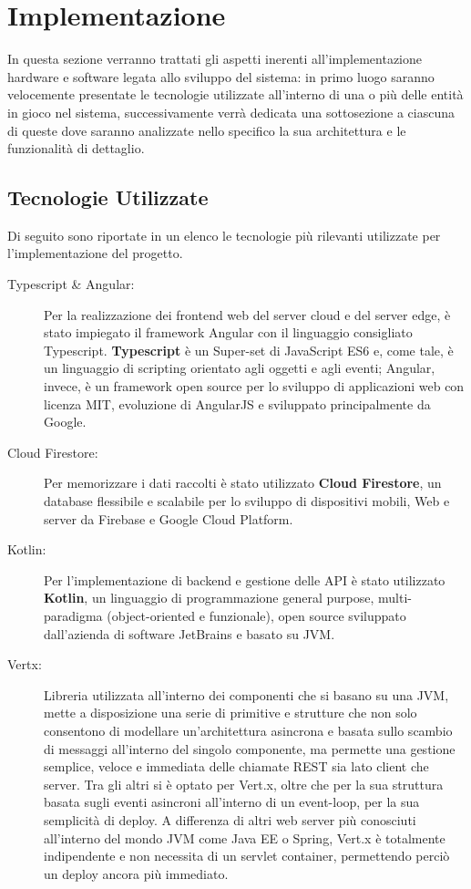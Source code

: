 \section{Implementazione}\label{sec:implementazione}

In questa sezione verranno trattati gli aspetti inerenti all’implementazione hardware
e software legata allo sviluppo del sistema: in primo luogo saranno velocemente
presentate le tecnologie utilizzate all’interno di una o più delle entità in
gioco nel sistema, successivamente verrà dedicata una sottosezione a ciascuna di
queste dove saranno analizzate nello specifico la sua architettura e le funzionalità
di dettaglio.

\subsection{Tecnologie Utilizzate}

Di seguito sono riportate in un elenco le tecnologie più rilevanti utilizzate per l'implementazione del progetto.

\begin{description}
  \item[Typescript \& Angular: ]
    Per la realizzazione dei frontend web del server cloud e del server edge, è stato impiegato il framework Angular con il linguaggio consigliato Typescript.
    \textbf{Typescript} è un Super-set di JavaScript ES6 e, come tale, è un linguaggio di scripting orientato agli oggetti e agli eventi; Angular, invece, è un framework open source per lo sviluppo di applicazioni web con licenza MIT, evoluzione di AngularJS e sviluppato principalmente da Google.
  \item[Cloud Firestore: ]
    Per memorizzare i dati raccolti è stato utilizzato \textbf{Cloud Firestore}, un database flessibile e scalabile per lo sviluppo di dispositivi mobili, Web e server da Firebase e Google Cloud Platform.
  \item[Kotlin: ]
    Per l'implementazione di backend e gestione delle API è stato utilizzato \textbf{Kotlin}, un linguaggio di programmazione general purpose, multi-paradigma (object-oriented e funzionale), open source sviluppato dall'azienda di software JetBrains e basato su JVM.
  \item[Vertx: ]
  Libreria utilizzata all’interno dei componenti che si basano su una JVM, mette a disposizione una serie di primitive e strutture che non solo consentono di modellare un’architettura asincrona e basata sullo scambio di messaggi all’interno del singolo componente, ma permette una gestione semplice, veloce e immediata delle chiamate REST sia lato client che server.
  Tra gli altri si è optato per Vert.x, oltre che per la sua struttura basata sugli eventi asincroni all’interno di un event-loop, per la sua semplicità di deploy. A differenza di altri web server più conosciuti all’interno del mondo JVM come Java EE o Spring, Vert.x è totalmente indipendente e non necessita di un servlet container, permettendo perciò un deploy ancora più immediato.
\end{description}


